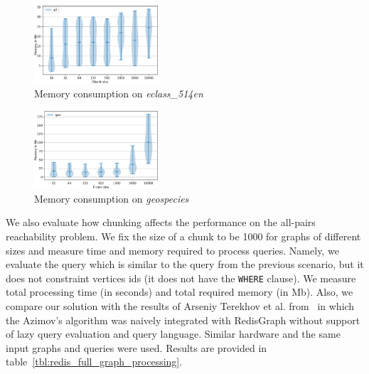 \begin{figure}[t]
\centering
\includegraphics[width=0.41\textwidth]{data/raw_memory/eclass_514en.pdf}
\caption{Memory consumption on \textit{eclass\_514en}}
\label{fig:redis_memory_eclass}
\end{figure}

\begin{figure}[t]
\centering
\includegraphics[width=0.41\textwidth]{data/raw_memory/geospecies.pdf}
\caption{Memory consumption on \textit{geospecies}}
\label{fig:redis_memory_geospecies}
\end{figure}

We also evaluate how chunking affects the performance on the all-pairs reachability problem.
We fix the size of a chunk to be 1000 for graphs of different sizes and measure time and memory required to process queries.
Namely, we evaluate the query which is similar to the query from the previous scenario, but it does not constraint vertices ids (it does not have the \texttt{WHERE} clause).
We measure total processing time (in seconds) and total required memory (in Mb).
Also, we compare our solution with the results of Arseniy Terekhov et al. from~\cite{10.1145/3398682.3399163} in which the Azimov's algorithm was naively integrated with RedisGraph without support of lazy query evaluation and query language.
Similar hardware and the same input graphs and queries were used.
Results are provided in table~\ref{tbl:redis_full_graph_processing}.

